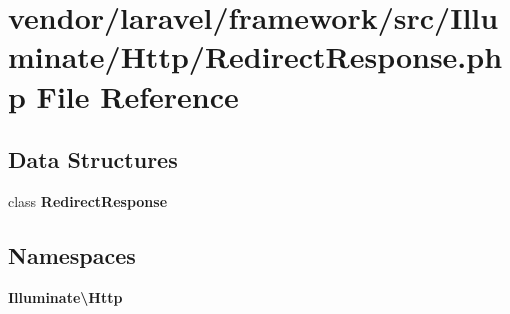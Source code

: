 \section{vendor/laravel/framework/src/\+Illuminate/\+Http/\+Redirect\+Response.php File Reference}
\label{laravel_2framework_2src_2_illuminate_2_http_2_redirect_response_8php}
\subsection*{Data Structures}
\begin{DoxyCompactItemize}
\item 
class {\bf Redirect\+Response}
\end{DoxyCompactItemize}
\subsection*{Namespaces}
\begin{DoxyCompactItemize}
\item 
 {\bf Illuminate\textbackslash{}\+Http}
\end{DoxyCompactItemize}
